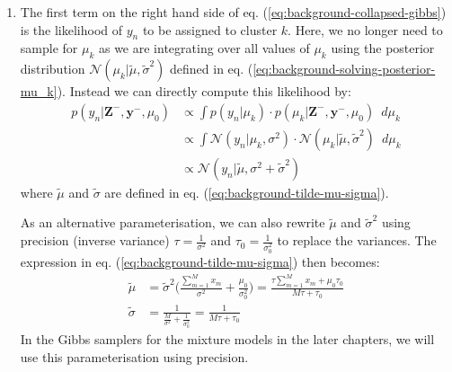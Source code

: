 \begin{enumerate}

\item The first term on the right hand side of eq. (\ref{eq:background-collapsed-gibbs}) is the likelihood of $y_n$ to be assigned to cluster $k$. Here, we no longer need to sample for $\mu_k$ as we are integrating over all values of $\mu_k$ using the posterior distribution $\mathcal{N}(\mu_k \vert \tilde{\mu}, \tilde{\sigma}^2)$ defined in eq. (\ref{eq:background-solving-posterior-mu_k}). Instead we can directly compute this likelihood by:
\begin{equation}
\begin{aligned}
p(y_n \vert \boldsymbol{Z}^{-},  \boldsymbol{y}^{-}, \mu_0) &\propto \int p(y_n \vert \mu_k) \cdot p(\mu_k \vert \boldsymbol{Z}^{-},  \boldsymbol{y}^{-}, \mu_0) \enspace d\mu_k \\
                                                                                            &\propto \int \mathcal{N}(y_n \vert \mu_k, \sigma^2) \cdot \mathcal{N}(\mu_k \vert \tilde{\mu}, \tilde{\sigma}^2) \enspace d\mu_k \\
                                                                                            &\propto \mathcal{N}(y_n \vert \tilde{\mu}, \sigma^2 + \tilde{\sigma}^2)
\end{aligned}
\label{eq:background-tilde-mu-sigma-variance}
\end{equation}
where $\tilde{\mu}$ and $\tilde{\sigma}$ are defined in eq. (\ref{eq:background-tilde-mu-sigma}). 

As an alternative parameterisation, we can also rewrite $\tilde{\mu}$ and $\tilde{\sigma}^2$ using precision (inverse variance) $\tau=\frac{1}{\sigma^2}$ and $\tau_0=\frac{1}{\sigma_0^2}$ to replace the variances. The expression in eq. (\ref{eq:background-tilde-mu-sigma}) then becomes:
\begin{equation}
\begin{aligned}
\tilde{\mu}     &= \tilde{\sigma}^2 \bigg( \frac{\sum_{m=1}^{M} x_m}{\sigma^2} + \frac{\mu_0}{\sigma_0^2} \bigg) = \frac{\tau\sum_{m=1}^{M} x_m + \mu_0\tau_0}{M\tau + \tau_0} \\
\tilde{\sigma} &= \frac{1}{\frac{M}{\sigma^2} + \frac{1}{\sigma^2_0}} = \frac{1}{M\tau + \tau_0}
\label{eq:background-tilde-mu-sigma-precision}
\end{aligned}
\end{equation}
In the Gibbs samplers for the mixture models in the later chapters, we will use this parameterisation using precision.


\end{enumerate}
